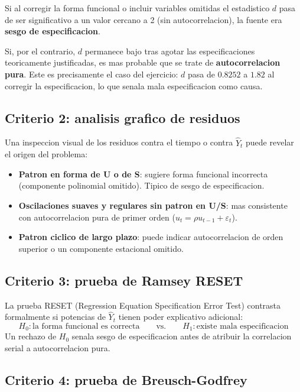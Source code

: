 \documentclass[12pt, letterpaper]{article}
\begin{document}
Si al corregir la forma funcional o incluir variables omitidas el estadistico
$d$ pasa de ser significativo a un valor cercano a 2 (sin autocorrelacion), la
fuente era \textbf{sesgo de especificacion}.

Si, por el contrario, $d$ permanece bajo tras agotar las especificaciones
teoricamente justificadas, es mas probable que se trate de \textbf{autocorrelacion
pura}. Este es precisamente el caso del ejercicio: $d$ pasa de $0.8252$ a $1.82$
al corregir la especificacion, lo que senala mala especificacion como causa.

\subsection{Criterio 2: analisis grafico de residuos}

Una inspeccion visual de los residuos contra el tiempo o contra $\hat Y_t$ puede
revelar el origen del problema:
\begin{itemize}[leftmargin=1.6em, itemsep=3pt]
  \item \textbf{Patron en forma de U o de S}: sugiere forma funcional incorrecta
    (componente polinomial omitido). Tipico de sesgo de especificacion.
  \item \textbf{Oscilaciones suaves y regulares sin patron en U/S}: mas consistente
    con autocorrelacion pura de primer orden ($u_t = \rho u_{t-1} + \varepsilon_t$).
  \item \textbf{Patron ciclico de largo plazo}: puede indicar autocorrelacion de
    orden superior o un componente estacional omitido.
\end{itemize}

\subsection{Criterio 3: prueba de Ramsey RESET}

La prueba RESET (Regression Equation Specification Error Test) contrasta
formalmente si potencias de $\hat Y_t$ tienen poder explicativo adicional:
\begin{equation}
  H_0: \text{la forma funcional es correcta}
  \qquad \text{vs.} \qquad
  H_1: \text{existe mala especificacion}
\end{equation}
Un rechazo de $H_0$ senala sesgo de especificacion antes de atribuir la
correlacion serial a autocorrelacion pura.

\subsection{Criterio 4: prueba de Breusch-Godfrey}
\end{document}
